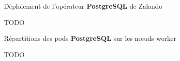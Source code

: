 
\begin{frame}[fragile]{Déploiement de l'opérateur \textbf{PostgreSQL} de Zalando}

TODO

\end{frame}


\begin{frame}[fragile]{Répartitions des pods \textbf{PostgreSQL} sur les n{\oe}uds worker}

TODO

\end{frame}

